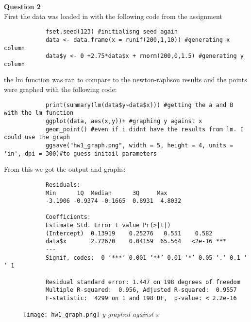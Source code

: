 \documentclass{article}
\begin{document}
		
		
		\textbf{\Large Question 2\\}
		First the data was loaded in with the following code from the assignment
		\begin{verbatim}
			fset.seed(123) #initialisng seed again
			data <- data.frame(x = runif(200,1,10)) #generating x column
			data$y <- 0 +2.75*data$x + rnorm(200,0,1.5) #generating y column
		\end{verbatim}
		the lm function was ran to compare to the newton-raphson results and the points were graphed with the following code:
		\begin{verbatim}
			print(summary(lm(data$y~data$x))) #getting the a and B with the lm function
			ggplot(data, aes(x,y))+ #graphing y against x 
			geom_point() #even if i didnt have the results from lm. I could use the graph
			ggsave("hw1_graph.png", width = 5, height = 4, units = 'in', dpi = 300)#to guess initail parameters
		\end{verbatim}
		From this we got the output and graphs:
		\begin{verbatim}
			Residuals:
			Min      1Q  Median      3Q     Max 
			-3.1906 -0.9374 -0.1665  0.8931  4.8032 
			
			Coefficients:
			Estimate Std. Error t value Pr(>|t|)    
			(Intercept)  0.13919    0.25276   0.551    0.582    
			data$x       2.72670    0.04159  65.564   <2e-16 ***
			---
			Signif. codes:  0 ‘***’ 0.001 ‘**’ 0.01 ‘*’ 0.05 ‘.’ 0.1 ‘ ’ 1
			
			Residual standard error: 1.447 on 198 degrees of freedom
			Multiple R-squared:  0.956,	Adjusted R-squared:  0.9557 
			F-statistic:  4299 on 1 and 198 DF,  p-value: < 2.2e-16
		\end{verbatim}
		\begin{figure}[h]
			\centering
			\texttt{[image: hw1\_graph.png]}
			\textit{y graphed against x}
		\end{figure}
		\clearpage
\end{document}
